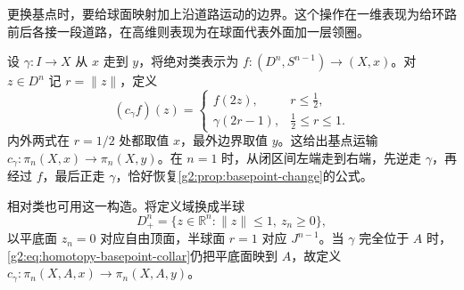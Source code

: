 更换基点时，要给球面映射加上沿道路运动的边界。这个操作在一维表现为给环路前后各接一段道路，在高维则表现为在球面代表外面加一层领圈。

设 \(\gamma:I\to X\) 从 \(x\) 走到 \(y\)，将绝对类表示为 \(f:(D^n,S^{n-1})\to(X,x)\)。对 \(z\in D^n\) 记 \(r=\lVert z\rVert\)，定义
\begin{equation}\label{g2:eq:homotopy-basepoint-collar}
	(c_\gamma f)(z)=
	\begin{cases}
		f(2z),&r\le\tfrac12,\\
		\gamma(2r-1),&\tfrac12\le r\le1.
	\end{cases}
\end{equation}
内外两式在 \(r=1/2\) 处都取值 \(x\)，最外边界取值 \(y\)。这给出基点运输 \(c_\gamma:\pi_n(X,x)\to\pi_n(X,y)\)。在 \(n=1\) 时，从闭区间左端走到右端，先逆走 \(\gamma\)，再经过 \(f\)，最后正走 \(\gamma\)，恰好恢复\cref{g2:prop:basepoint-change}的公式。

相对类也可用这一构造。将定义域换成半球
\[
	D^n_+=\{z\in\mathbb R^n:\lVert z\rVert\le1,\ z_n\ge0\},
\]
以平底面 \(z_n=0\) 对应自由顶面，半球面 \(r=1\) 对应 \(J^{n-1}\)。当 \(\gamma\) 完全位于 \(A\) 时，\eqref{g2:eq:homotopy-basepoint-collar}仍把平底面映到 \(A\)，故定义 \(c_\gamma:\pi_n(X,A,x)\to\pi_n(X,A,y)\)。

